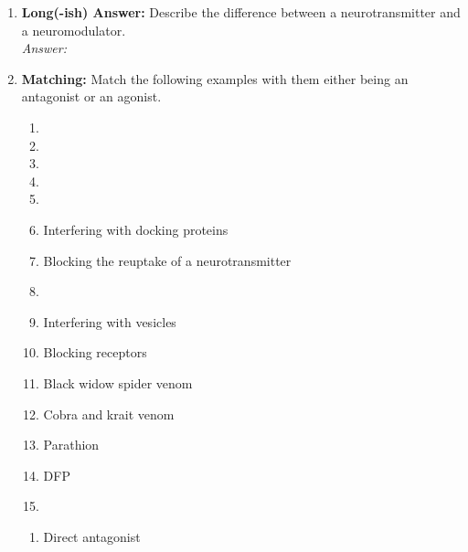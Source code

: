 \begin{enumerate}[label=\textbf{Q3.1.\arabic*}]
    \item \textbf{Long(-ish) Answer:} Describe the difference between a neurotransmitter and a neuromodulator. \\
        \textit{Answer:} \\[1cm] %
\newpage
    \item \textbf{Matching:} Match the following examples with them either being an antagonist or an agonist.
    \begin{wordbox}
        \begin{enumerate}
            \item {} %
            \item {} %
            \item {} %
            \item {} %
            \item {} %
            \item Interfering with docking proteins %
            \item Blocking the reuptake of a neurotransmitter %
            \item {} %
            \item Interfering with vesicles %
            \item Blocking receptors %
            \item Black widow spider venom %
            \item Cobra and krait venom %
            \item Parathion %
            \item DFP %
            \item {} %
        \end{enumerate}
    \end{wordbox}
    \begin{enumerate}[label=(\arabic*)]
        \item Direct antagonist \quad \dotfill \quad \underline{\hspace{3cm}} 

\end{enumerate}
\end{enumerate}
